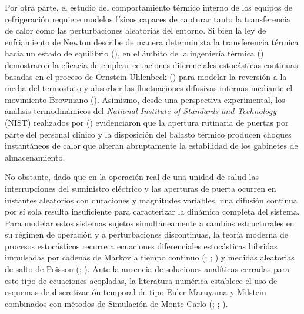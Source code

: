 \documentclass[
  spanish,
  us-letterpaper,
]{scrreprt}
\numberwithin{equation}{section}
\theoremstyle{plain}
\theoremstyle{plain}
\theoremstyle{definition}
\theoremstyle{plain}
\theoremstyle{remark}
\begin{document}
Por otra parte, el estudio del comportamiento térmico interno de los
equipos de refrigeración requiere modelos físicos capaces de capturar
tanto la transferencia de calor como las perturbaciones aleatorias del
entorno. Si bien la ley de enfriamiento de Newton describe de manera
determinista la transferencia térmica hacia un estado de equilibrio
(), en el ámbito de la
ingeniería térmica () demostraron la eficacia de emplear ecuaciones diferenciales
estocásticas continuas basadas en el proceso de Ornstein-Uhlenbeck
() para
modelar la reversión a la media del termostato y absorber las
fluctuaciones difusivas internas mediante el movimiento Browniano
(). Asimismo,
desde una perspectiva experimental, los análisis termodinámicos del
\emph{National Institute of Standards and Technology} (NIST) realizados
por () evidenciaron
que la apertura rutinaria de puertas por parte del personal clínico y la
disposición del balasto térmico producen choques instantáneos de calor
que alteran abruptamente la estabilidad de los gabinetes de
almacenamiento.

No obstante, dado que en la operación real de una unidad de salud las
interrupciones del suministro eléctrico y las aperturas de puerta
ocurren en instantes aleatorios con duraciones y magnitudes variables,
una difusión continua por sí sola resulta insuficiente para caracterizar
la dinámica completa del sistema. Para modelar estos sistemas sujetos
simultáneamente a cambios estructurales en su régimen de operación y a
perturbaciones discontinuas, la teoría moderna de procesos estocásticos
recurre a ecuaciones diferenciales estocásticas híbridas impulsadas por
cadenas de Markov a tiempo continuo
(;
;
) y medidas aleatorias de
salto de Poisson (;
). Ante
la ausencia de soluciones analíticas cerradas para este tipo de
ecuaciones acopladas, la literatura numérica establece el uso de
esquemas de discretización temporal de tipo Euler-Maruyama y Milstein
combinados con métodos de Simulación de Monte Carlo
(;
;
).
\end{document}
